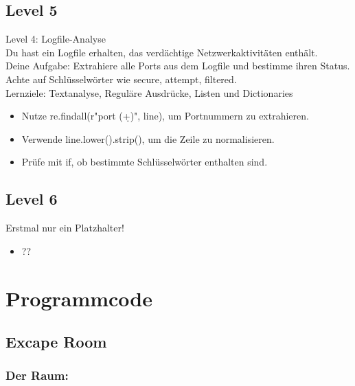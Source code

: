 \documentclass[a4paper 11pt]{article}
\begin{document}
\subsection{Level 5}

Level 4: Logfile-Analyse\\
Du hast ein Logfile erhalten, das verdächtige Netzwerkaktivitäten enthält.\\
Deine Aufgabe: Extrahiere alle Ports aus dem Logfile und bestimme ihren Status.\\
Achte auf Schlüsselwörter wie secure, attempt, filtered.\\
Lernziele: Textanalyse, Reguläre Ausdrücke, Listen und Dictionaries\\

\begin{itemize}
\addtolength{\itemindent}{0.80cm}
\itemsep0em
\item Nutze re.findall(r"port (\d+)", line), um Portnummern zu extrahieren.
\item Verwende line.lower().strip(), um die Zeile zu normalisieren.
\item Prüfe mit if, ob bestimmte Schlüsselwörter enthalten sind.
\end{itemize}

\subsection{Level 6}

Erstmal nur ein Platzhalter!

\begin{itemize}
\addtolength{\itemindent}{0.80cm}
\itemsep0em
\item ??
\end{itemize}

\normalsize
\newpage
\section{Programmcode}
\subsection{Excape Room}
\subsubsection{Der Raum:}
\end{document}
